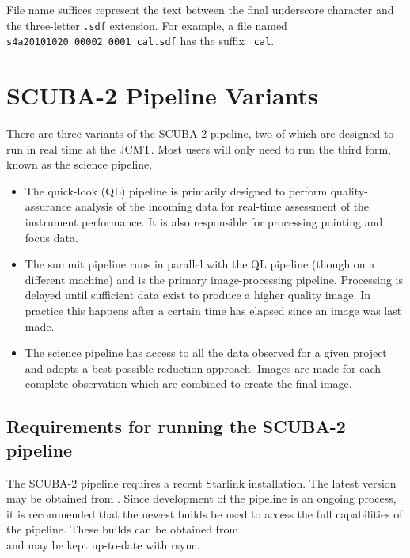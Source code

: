 \documentclass[twoside,11pt,nolof]{starlink}
\begin{document}
File name suffices represent the text between the final underscore
character and the three-letter \verb+.sdf+ extension. For example, a
file named \verb+s4a20101020_00002_0001_cal.sdf+ has the suffix
\verb+_cal+.

\section{SCUBA-2 Pipeline Variants\label{se:pipelines}}

There are three variants of the SCUBA-2 pipeline, two of which are
designed to run in real time at the JCMT. Most users will only need to
run the third form, known as the science pipeline.

\begin{itemize}
\item The quick-look (QL) pipeline is primarily designed to perform
  quality-assurance analysis of the incoming data for real-time
  assessment of the instrument performance. It is also responsible for
  processing pointing and focus data.

\item The summit pipeline runs in parallel with the QL pipeline
  (though on a different machine) and is the primary image-processing
  pipeline. Processing is delayed until sufficient data exist to
  produce a higher quality image. In practice this happens after a
  certain time has elapsed since an image was last made.

\item The science pipeline has access to all the data observed for a
  given project and adopts a best-possible reduction approach. Images
  are made for each complete observation which are combined to create
  the final image.
\end{itemize}

\subsection{Requirements for running the SCUBA-2 pipeline}

The SCUBA-2 pipeline requires a recent Starlink installation. The
latest version may be obtained from
. Since
development of the pipeline is an ongoing process, it is recommended
that the newest builds be used to access the full capabilities of the
pipeline. These builds can be obtained from\\
and may be kept up-to-date with rsync.
\end{document}
